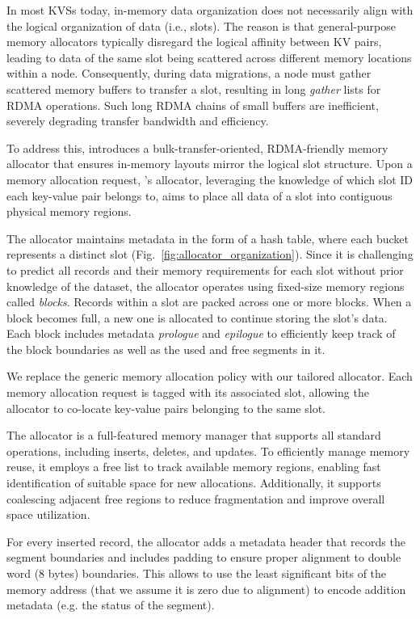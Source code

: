 In most KVSs today, in-memory data organization does not necessarily align with the logical organization of data (i.e., slots).
The reason is that general-purpose memory allocators typically disregard the logical affinity between KV pairs, leading to data of the same slot being scattered across different memory locations within a node. Consequently, during data migrations, a node must gather scattered memory buffers to transfer a slot, resulting in long \emph{gather} lists for RDMA operations. 
Such long RDMA chains of small buffers are inefficient, severely degrading transfer bandwidth and efficiency.

To address this, \OurImplementation{} introduces a bulk-transfer-oriented, RDMA-friendly memory allocator that ensures in-memory layouts mirror the logical slot structure.
Upon a memory allocation request, \OurImplementation{}’s allocator, leveraging the knowledge of which slot ID each key-value pair belongs to, aims to place all data of a slot into contiguous physical memory regions. 

The allocator maintains metadata in the form of a hash table, where each bucket represents a distinct slot (Fig.~\ref{fig:allocator_organization}).
Since it is challenging to predict all records and their memory requirements for each slot without prior knowledge of the dataset, the allocator operates using fixed-size memory regions called \emph{blocks}.
Records within a slot are packed across one or more blocks. When a block becomes full, a new one is allocated to continue storing the slot's data.
Each block includes metadata \emph{prologue} and \emph{epilogue} to efficiently keep track of the block boundaries as well as the used and free segments in it.

We replace the generic memory allocation policy with our tailored allocator.
Each memory allocation request is tagged with its associated slot, allowing the allocator to co-locate key-value pairs belonging to the same slot.

The allocator is a full-featured memory manager that supports all standard operations, including inserts, deletes, and updates.
To efficiently manage memory reuse, it employs a free list to track available memory regions, enabling fast identification of suitable space for new allocations.
Additionally, it supports coalescing adjacent free regions to reduce fragmentation and improve overall space utilization.

For every inserted record, the allocator adds a metadata header that records the segment boundaries and includes padding to ensure proper alignment to double word (8 bytes) boundaries.
This allows to use the least significant bits of the memory address (that we assume it is zero due to alignment) to encode addition metadata (e.g. the status of the segment).

